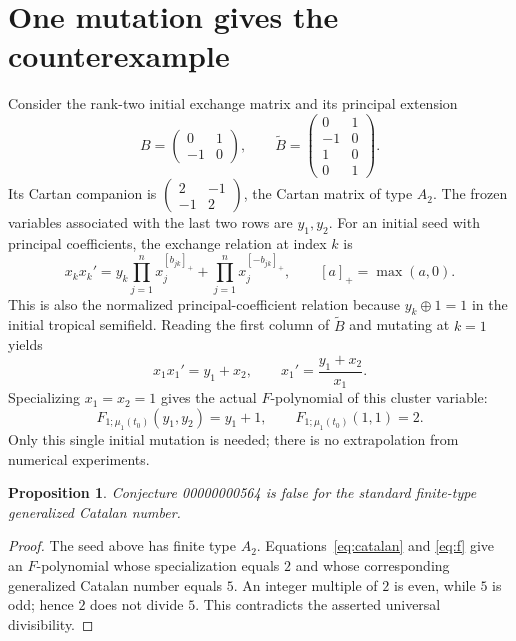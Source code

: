 \documentclass[11pt,a4paper]{article}
\newtheorem{proposition}{Proposition}
\begin{document}
\section{One mutation gives the counterexample}
Consider the rank-two initial exchange matrix and its principal extension
\[
 B=\begin{pmatrix}0&1\\-1&0\end{pmatrix},
 \qquad
 \widetilde B=
 \begin{pmatrix}0&1\\-1&0\\1&0\\0&1\end{pmatrix}.
\]
Its Cartan companion is
$\left(\begin{smallmatrix}2&-1\\-1&2\end{smallmatrix}\right)$,
the Cartan matrix of type $A_2$. The frozen variables associated with
the last two rows are $y_1,y_2$.
For an initial seed with principal coefficients, the exchange relation
at index $k$ is
\begin{equation}\label{eq:exchange}
 x_k x_k'=
 y_k\prod_{j=1}^{n}x_j^{[b_{jk}]_+}
 +\prod_{j=1}^{n}x_j^{[-b_{jk}]_+},
 \qquad [a]_+=\max(a,0).
\end{equation}
This is also the normalized principal-coefficient relation because
$y_k\mathbin{\oplus}1=1$ in the initial tropical semifield.
Reading the first column of $\widetilde B$ and mutating at $k=1$ yields
\[
  x_1x_1'=y_1+x_2,\qquad x_1'=\frac{y_1+x_2}{x_1}.
\]
Specializing $x_1=x_2=1$ gives the actual $F$-polynomial of this
cluster variable:
\begin{equation}\label{eq:f}
  F_{1;\mu_1(t_0)}(y_1,y_2)=y_1+1,
  \qquad F_{1;\mu_1(t_0)}(1,1)=2.
\end{equation}
Only this single initial mutation is needed; there is no extrapolation
from numerical experiments.

\begin{proposition}
Conjecture 00000000564 is false for the standard finite-type generalized
Catalan number.
\end{proposition}
\begin{proof}
The seed above has finite type $A_2$. Equations~\eqref{eq:catalan} and
\eqref{eq:f} give an $F$-polynomial whose specialization equals $2$
and whose corresponding generalized Catalan number equals $5$.
An integer multiple of $2$ is even, while $5$ is odd; hence $2$ does
not divide $5$. This contradicts the asserted universal divisibility.
\end{proof}
\end{document}
